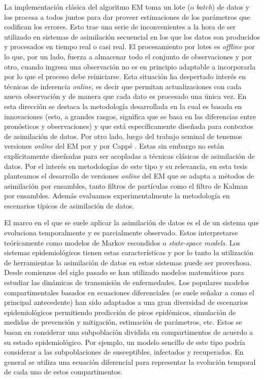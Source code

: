 La implementación clásica del algoritmo EM toma un lote (o \textit{batch}) de datos y los procesa a todos juntos para dar proveer estimaciones de los parámetros que codifican los errores. Esto trae una serie de inconvenientes a la hora de ser utilizado en sistemas de asimilación secuencial en los que los datos son producidos y procesados en tiempo real o casi real. El procesamiento por lotes es \textit{offline} por lo que, por un lado, fuerza a almacenar todo el conjunto de observaciones y por otro, cuando ingresa una observación no es en principio adaptable a incorporarla por lo que el proceso debe reiniciarse. Esta situación ha despertado interés en técnicas de inferencia \textit{online}, es decir que permitan actualizaciones con cada nueva observación y de manera que cada dato es procesado una única vez. En esta dirección se destaca la metodología desarrollada en \cite{Berry2013} la cual es basada en innovaciones (esto, a grandes rasgos, significa que se basa en las diferencias entre pronósticos y observaciones) y que está específicamente diseñada para contextos de asimilación de datos. Por otro lado, luego del trabajo seminal de \cite{Neal1998} tenemos versiones \textit{online} del EM por \cite{Andrieu2003} y por Cappé \citep{Cappe2009,Cappe2011}. Estas sin embargo no están explícitamente diseñadas para ser acopladas a técnicas clásicas de asimilación de datos. Por el interés en metodologías de este tipo y su relevancia, en esta tesis planteamos el desarrollo de versiones \textit{online} del EM que se adapta a métodos de asimilación por ensambles, tanto filtros de partículas como el filtro de Kalman por ensambles. Además evaluamos experimentalmente la metodología en escenarios típicos de asimilación de datos.

El marco en el que se suele aplicar la asimilación de datos es el de un sistema que evoluciona temporalmente y es parcialmente observado. Estos interpretarse teóricamente como modelos de Markov escondidos o \textit{state-space models}. Los sistemas epidemiológicos tienen estas características y por lo tanto la utilización de herramientas la asimilación de datos en estos sistemas puede ser provechosa. Desde comienzos del siglo pasado se han utilizado modelos matemáticos para estudiar las dinámicas de transmisión de enfermedades. Los populares modelos compartimentales basados en ecuaciones diferenciales (se suele señalar a \cite{Kermack1927} como el principal antecedente) han sido adaptados a una gran diversidad de escenarios epidemiológicos permitiendo predicción de picos epidémicos, simulación de medidas de prevención y mitigación, estimación de parámetros, etc. Estos se basan en considerar una subpoblación dividida en compartimentos de acuerdo a su estado epidemiológico. Por ejemplo, un modelo sencillo de este tipo podría considerar a las subpoblaciones de susceptibles, infectados y recuperados. En general se utiliza una ecuación diferencial para representar la evolución temporal de cada uno de estos compartimentos.

